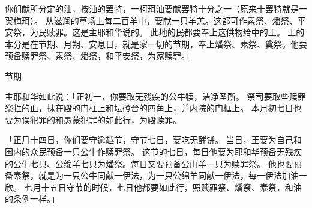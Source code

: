 {你们献所分定的油，按油的罢特，一柯珥油要献罢特十分之一（原来十罢特就是一贺梅珥）。
从{}滋润的草场上每二百羊中，要献一只羊羔。这都可作素祭、燔祭、平安祭，为民赎罪。这是主耶和华说的。
此地的民都要奉上这供物给{}中的王。
王的本分是在节期、月朔、安息日，就是{}家一切的节期，奉上燔祭、素祭、奠祭。他要预备赎罪祭、素祭、燔祭，和平安祭，为{}家赎罪。」
\par }{\SH 节期
\par }{\PP {}主耶和华如此说：「正{}初一{}，你要取无残疾的公牛犊，洁净圣所。
祭司要取些赎罪祭牲的血，抹在殿的门柱上和坛磴台的四角上，并内院的门框上。
本月初七日也要为误犯罪的和愚蒙犯罪的如此行，为殿赎罪。
\par }{\PP {}「正月十四日，你们要守逾越节，守节七日，要吃无酵饼。
当日，王要为自己和国内的众民预备一只公牛作赎罪祭。
这节的七日，每日他要为耶和华预备无残疾的公牛七只、公绵羊七只为燔祭。每日又要预备公山羊一只为赎罪祭。
他也要预备素祭，就是为一只公牛同献一伊法{}，为一只公绵羊同献一伊法{}，每一伊法{}加油一欣。
七月十五日守节的时候，七日他都要如此行，照{}赎罪祭、燔祭、素祭，和油的条例一样。」

}
